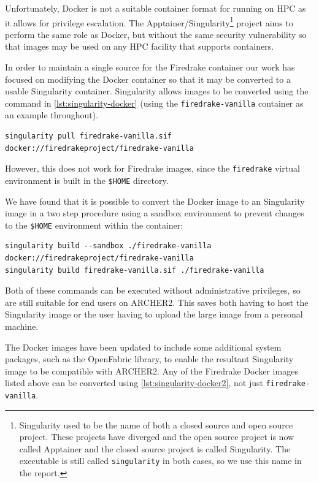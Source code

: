 \documentclass[a4paper,11pt]{article}
\begin{document}
Unfortunately, Docker is not a suitable container format for running on HPC as it allows for privilege escalation.
The Apptainer/Singularity\footnote{Singularity used to be the name of both a closed source and open source project. These projects have diverged and the open source project is now called Apptainer and the closed source project is called Singularity. The executable is still called \texttt{singularity} in both cases, so we use this name in the report.} 
project aims to perform the same role as Docker, but without the same security vulnerability so that images may be used on any HPC facility that supports containers.

In order to maintain a single source for the Firedrake container our work has focused on modifying the Docker container so that it may be converted to a usable Singularity container.
Singularity allows images to be converted using the command in \cref{lst:singularity-docker} (using the \verb`firedrake-vanilla` container as an example throughout).
\begin{lstlisting}[numbers=none,float,caption={One step (pull and) conversion from Docker image format to Singulrity image format},label={lst:singularity-docker}]
singularity pull firedrake-vanilla.sif docker://firedrakeproject/firedrake-vanilla
\end{lstlisting}
However, this does not work for Firedrake images, since the \verb`firedrake` virtual environment is built in the \verb`$HOME` directory.

We have found that it is possible to convert the Docker image to an Singularity image in a two step procedure using a sandbox environment to prevent changes to the \verb`$HOME` environment within the container:
\begin{lstlisting}[caption={Two step procedure 1. (pull and) build with sandbox from Dockerhub, 2. Build Singulrity image format},label={lst:singularity-docker2}]
singularity build --sandbox ./firedrake-vanilla docker://firedrakeproject/firedrake-vanilla
singularity build firedrake-vanilla.sif ./firedrake-vanilla
\end{lstlisting}
Both of these commands can be executed without administrative privileges, so are still suitable for end users on ARCHER2.
This saves both having to host the Singularity image or the user having to upload the large image from a personal machine.

The Docker images have been updated to include some additional system packages, such as the OpenFabric library, to enable the resultant Singularity image to be compatible with ARCHER2.
Any of the Firedrake Docker images listed above can be converted using \cref{lst:singularity-docker2}, not just \verb`firedrake-vanilla`.
\end{document}
